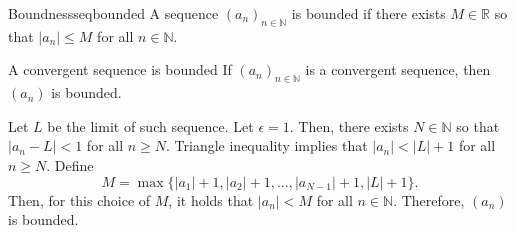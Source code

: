 
\begin{defn}{Boundness}{seqbounded}
	A sequence \((a_n)_{n\in\mathbb{N}}\) is bounded if there exists \(M \in \mathbb{R}\) so that \(|a_n| \leq M\) for all \(n \in \mathbb{N}\).
\end{defn}

\begin{thm}{A convergent sequence is bounded}{}
	If \((a_n)_{n\in\mathbb{N}}\) is a convergent sequence, then \((a_n)\) is bounded.
\end{thm}

\begin{dem}{}{}
	Let \(L\) be the limit of such sequence.
	Let \(\epsilon = 1\).
	Then, there exists \(N \in \mathbb{N}\) so that \(|a_n - L| < 1\) for all \(n \geq N\).
	Triangle inequality implies that \(|a_n| < |L| + 1\) for all \(n \geq N\).
	Define  \[
		M = \max\{|a_1| + 1, |a_2| + 1, \dots, |a_{N-1}| + 1, |L| + 1\}.
	\]
	Then, for this choice of \(M\), it holds that \(|a_n| < M\) for all \(n \in \mathbb{N}\).
	Therefore, \((a_n)\) is bounded.
\end{dem}

